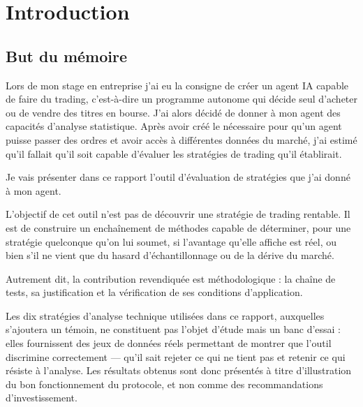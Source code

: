 \chapter*{Introduction}
\label{chap:intro}

\section*{But du mémoire}
\label{sec:but}


Lors de mon stage en entreprise j'ai eu la consigne de créer un agent IA capable de faire du trading,
c'est-à-dire un programme autonome qui décide seul d'acheter ou de vendre des titres en bourse.
J'ai alors décidé de donner à mon agent des capacités d'analyse statistique.
Après avoir créé le nécessaire pour qu'un agent puisse passer des ordres et
avoir accès à différentes données du marché, j'ai estimé qu'il fallait qu'il soit capable d'évaluer
les stratégies de trading qu'il établirait.

Je vais présenter dans ce rapport l'outil d'évaluation de stratégies que
j'ai donné à mon agent.

L'objectif de cet outil n'est pas de découvrir une stratégie de trading
rentable. Il est de construire un enchaînement de méthodes capable de
déterminer, pour une stratégie quelconque qu'on lui soumet, si l'avantage
qu'elle affiche est réel, ou bien s'il ne vient que du hasard
d'échantillonnage ou de la dérive du marché.

Autrement dit, la contribution revendiquée est méthodologique :
la chaîne de tests, sa justification et la vérification de ses conditions
d'application. 

Les dix stratégies d'analyse technique utilisées dans ce
rapport, auxquelles s'ajoutera un témoin, ne constituent pas l'objet
d'étude mais un banc d'essai :
elles fournissent des jeux de données réels permettant de
montrer que l'outil discrimine correctement — qu'il sait rejeter
ce qui ne tient pas et retenir ce qui résiste à l'analyse. Les résultats
obtenus sont donc présentés à titre d'illustration du bon
fonctionnement du protocole, et non comme des recommandations
d'investissement.

